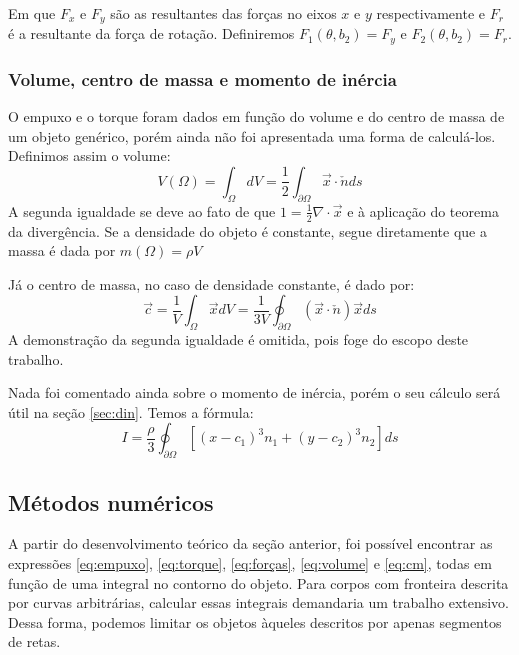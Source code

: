 \documentclass[
	12pt,				%
	oneside,			%
	a4paper,			%
	]{article}
\begin{document}
    Em que $F_x$ e $F_y$ são as resultantes das forças no eixos $x$ e $y$ respectivamente e $F_r$ é a resultante da força de rotação. Definiremos $F_1(\theta, b_2) = F_y$ e $F_2(\theta, b_2) = F_r$.

    \subsubsection{Volume, centro de massa e momento de inércia}
    O empuxo e o torque foram dados em função do volume e do centro de massa de um objeto genérico, porém ainda não foi apresentada uma forma de calculá-los. Definimos assim o volume:
    \begin{equation}
        V(\Omega) = \int_\Omega dV = \frac{1}{2} \int_{\partial \Omega} \vec{x} \cdot \check{n} ds
        \label{eq:volume}
    \end{equation}
    A segunda igualdade se deve ao fato de que $1 = \frac{1}{2} \nabla \cdot \vec{x}$ e à aplicação do teorema da divergência. Se a densidade do objeto é constante, segue diretamente que a massa é dada por $m(\Omega) = \rho V$

    Já o centro de massa, no caso de densidade constante, é dado por:
    \begin{equation}
        \vec{c} = \frac{1}{V} \int_\Omega \vec{x} dV = \frac{1}{3V} \oint_{\partial \Omega} (\vec{x} \cdot \check{n})\vec{x} ds
        \label{eq:cm}
    \end{equation}
    A demonstração da segunda igualdade é omitida, pois foge do escopo deste trabalho.

    Nada foi comentado ainda sobre o momento de inércia, porém o seu cálculo será útil na seção \ref{sec:din}. Temos a fórmula:
    \[
        I = \frac{\rho}{3} \oint_{\partial \Omega} \left[ (x-c_1)^3 n_1 + (y-c_2)^3 n_2 \right] ds
    \]

    \subsection{Métodos numéricos}
    A partir do desenvolvimento teórico da seção anterior, foi possível encontrar as expressões \ref{eq:empuxo}, \ref{eq:torque}, \ref{eq:forças}, \ref{eq:volume} e \ref{eq:cm}, todas em função de uma integral no contorno do objeto. Para corpos com fronteira descrita por curvas arbitrárias, calcular essas integrais demandaria um trabalho extensivo. Dessa forma, podemos limitar os objetos àqueles descritos por apenas segmentos de retas.
\end{document}
